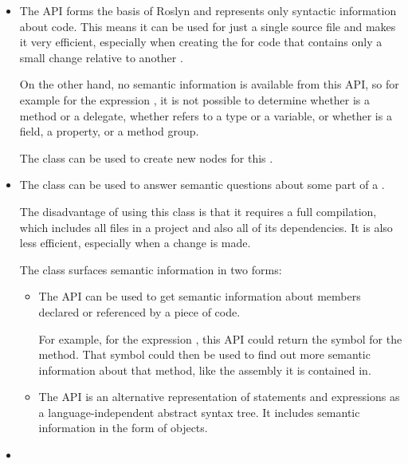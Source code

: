 \begin{itemize}
\item The  \ac{API} forms the basis of Roslyn and represents only syntactic information about code. This means it can be used for just a single source file and makes it very efficient, especially when creating the  for code that contains only a small change relative to another .

On the other hand, no semantic information is available from this \ac{API}, so for example for the expression , it is not possible to determine whether  is a method or a delegate, whether  refers to a type or a variable, or whether  is a field, a property, or a method group.

The  class can be used to create new nodes for this .

\item The  class can be used to answer semantic questions about some part of a .

The disadvantage of using this class is that it requires a full compilation, which includes all files in a project and also all of its dependencies. It is also less efficient, especially when a change is made.

The  class surfaces semantic information in two forms:

\begin{itemize}
\item The  \ac{API} can be used to get semantic information about members declared or referenced by a piece of code.

For example, for the expression , this \ac{API} could return the symbol for the  method. That symbol could then be used to find out more semantic information about that method, like the assembly it is contained in.

\item The  \ac{API} is an alternative representation of statements and expressions as a language-independent abstract syntax tree. It includes semantic information in the form of  objects.

\end{itemize}

\item {}
\end{itemize}

